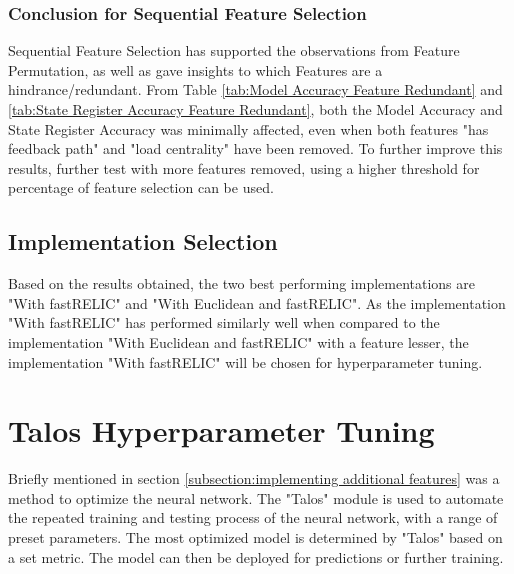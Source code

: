 \documentclass{tum-book}
\begin{document}
        \begin{table}
            \centering
            
        \end{table}
        
        \begin{table}
            \centering
            
        \end{table}
        
        \begin{table}
            \centering
            
        \end{table}
        
        
        \newpage\subsubsection{Conclusion for Sequential Feature Selection}
        Sequential Feature Selection has supported the observations from Feature Permutation, as well as gave insights to which Features are a hindrance/redundant. From Table \ref{tab:Model Accuracy Feature Redundant} and \ref{tab:State Register Accuracy Feature Redundant}, both the Model Accuracy and State Register Accuracy was minimally affected, even when both features "has feedback path" and "load centrality" have been removed. To further improve this results, further test with more features removed, using a higher threshold for percentage of feature
        selection can be used.  
    
        \subsection{Implementation Selection}
        Based on the results obtained, the two best performing implementations are "With fastRELIC" and "With Euclidean and fastRELIC". As the implementation "With fastRELIC" has performed similarly well when compared to the implementation "With Euclidean and fastRELIC" with a feature lesser, the implementation "With fastRELIC" will be chosen for hyperparameter tuning.  
    
    \newpage\section{Talos Hyperparameter Tuning}\label{Talos Tunning}
    Briefly mentioned in section \ref{subsection:implementing additional features} was a method to optimize the neural network. The "Talos" module is used to automate the repeated training and testing process of the neural network, with a range of preset parameters. The most optimized model is determined by "Talos" based on a set metric. The model can then be deployed for predictions or further training. 
    
\end{document}
